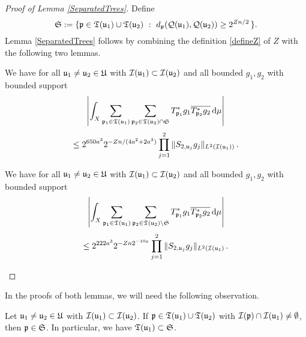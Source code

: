 {\begin{proof}[Proof of Lemma \ref{SeparatedTrees}]
    Define
    \begin{equation}
        \label{def Tree S set}
         \mathfrak{S} := \{\fp \in \fT(\fu_1) \cup \fT(\fu_2) \ : \ d_{\fp}(\fcc(\fu_1), \fcc(\fu_2)) \ge 2^{Zn/2}\,\}.
    \end{equation}
    Lemma \ref{SeparatedTrees} follows by combining the definition \eqref{defineZ} of $Z$ with the following two lemmas.
    \begin{lemma}
        \label{lem big sep tree}
        We have for all $\mathfrak u_1 \ne \mathfrak u_2 \in \mathfrak U$ with $\mathcal{I}(\mathfrak u_1) \subset \mathcal{I}(\mathfrak u_2)$ and all bounded $g_1, g_2$ with bounded support
        \begin{equation}
            \label{eq lhs big sep tree}
            \left| \int_X \sum_{\mathfrak p_1 \in \mathfrak T(\mathfrak u_1)} \sum_{\mathfrak p_2 \in \mathfrak T(\mathfrak u_2) \cap \mathfrak{S}} T^*_{\mathfrak p_1}g_1 \overline{T^*_{\mathfrak p_2}g_2 }\,\mathrm{d}\mu \right|
        \end{equation}
        \begin{equation}
            \label{eq rhs big sep tree}
            \le 2^{650a^3} 2^{-Zn/(4a^2 + 2a^3)} \prod_{j =1}^2 \| S_{2, \mathfrak u_j} g_j\|_{L^2(\mathcal{I}(\mathfrak u_1))}\,.
        \end{equation}
    \end{lemma}
    \begin{lemma}
        \label{lem small sep tree}
        We have for all $\mathfrak u_1 \ne \mathfrak u_2 \in \mathfrak U$ with $\mathcal{I}(\mathfrak u_1) \subset \mathcal{I}(\mathfrak u_2)$ and all bounded $g_1, g_2$ with bounded support
        \begin{equation}
            \label{eq lhs small sep tree}
            \left| \int_X \sum_{\mathfrak p_1 \in \mathfrak T(\mathfrak u_1)} \sum_{\mathfrak p_2 \in \mathfrak T(\mathfrak u_2) \setminus \mathfrak{S}} T^*_{\mathfrak p_1}g_1 \overline{T^*_{\mathfrak p_2}g_2 }\,\mathrm{d}\mu \right|
        \end{equation}
        \begin{equation}
            \label{eq rhs small sep tree}
            \le 2^{222a^3} 2^{-Zn 2^{-10a}} \prod_{j =1}^2 \| S_{2, \mathfrak u_j} g_j\|_{L^2(\mathcal{I}(\mathfrak u_1)}\,.
        \end{equation}
    \end{lemma}
\end{proof}

In the proofs of both lemmas, we will need the following observation.

\begin{lemma}
    \label{lem T1 S}
    Let $\mathfrak u_1 \ne \mathfrak u_2 \in \mathfrak U$ with $\mathcal{I}(\mathfrak u_1) \subset \mathcal{I}(\mathfrak u_2)$. If $\mathfrak p \in \mathfrak T(\mathfrak u_1) \cup \mathfrak T(\mathfrak u_2)$ with $\mathcal{I}(\mathfrak p) \cap \mathcal{I}(\mathfrak u_1) \ne \emptyset$, then $\mathfrak p \in \mathfrak{S}$. In particular, we have $\mathfrak T(\mathfrak u_1) \subset \mathfrak{S}$.
\end{lemma}

}
